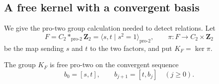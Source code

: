 \subsection{A free kernel with a convergent basis}

We give the pro-two group calculation needed to detect relations.
Let
\[
 F=C_2*_{\mathrm{pro}\text{-}2}\mathbf Z_2
   =\langle s,t\mid s^2=1\rangle_{\mathrm{pro}\text{-}2},
 \qquad
 \pi:F\longrightarrow C_2\times\mathbf Z_2
\]
be the map sending \(s\) and \(t\) to the two factors, and put
\(K_F=\ker\pi\).

\begin{lemma}\label{lem:free-product-cyclotomic-kernel}
The group \(K_F\) is free pro-two on the convergent sequence
\[
 b_0=[s,t],\qquad b_{j+1}=[t,b_j]\quad(j\ge0).
\]
\end{lemma}

